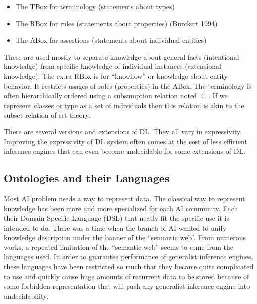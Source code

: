 \documentclass[11pt,a4paper,twoside,openright,titlepage,numbers=noenddot,headinclude,cleardoublepage=empty,openany]{scrreprt}
\theoremstyle{plain}
\theoremstyle{definition}
\theoremstyle{remark}
\providecommand{\tightlist}{%
  \setlength{\itemsep}{0pt}\setlength{\parskip}{0pt}}
\begin{document}
\begin{itemize}
\tightlist
\item
  The TBox for terminology (statements about types)
\item
  The RBox for rules (statements about properties) (Bürckert
  \protect\hyperlink{ref-burckert_terminologies_1994}{1994})
\item
  The ABox for assertions (statements about individual entities)
\end{itemize}

These are used mostly to separate knowledge about general facts
(intentional knowledge) from specific knowledge of individual instances
(extensional knowledge). The extra RBox is for ``knowhow'' or knowledge
about entity behavior. It restricts usages of roles (properties) in the
ABox. The terminology is often hierarchically ordered using a
subsumption relation noted \(\subseteq\). If we represent classes or
type as a set of individuals then this relation is akin to the subset
relation of set theory.

There are several versions and extensions of DL. They all vary in
expressivity. Improving the expressivity of DL system often comes at the
cost of less efficient inference engines that can even become
undecidable for some extensions of DL.

\hypertarget{ontologies-and-their-languages}{%
\subsection{Ontologies and their
Languages}\label{ontologies-and-their-languages}}

Most AI problem needs a way to represent data. The classical way to
represent knowledge has been more and more specialized for each AI
community. Each their Domain Specific Language (DSL) that neatly fit the
specific use it is intended to do. There was a time when the branch of
AI wanted to unify knowledge description under the banner of the
``semantic web''. From numerous works, a repeated limitation of the
``semantic web'' seems to come from the languages used. In order to
guarantee performance of generalist inference engines, these languages
have been restricted so much that they became quite complicated to use
and quickly cause huge amounts of recurrent data to be stored because of
some forbidden representation that will push any generalist inference
engine into undecidability.
\end{document}
